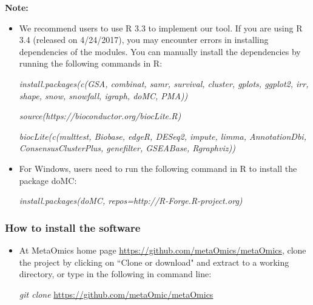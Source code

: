 {\bf Note:}
\begin{itemize}
\item We recommend users to use R 3.3 to implement our tool. If you are using R 3.4 (released on 4/24/2017), you may encounter errors in installing dependencies of the modules. You can manually install the dependencies by running the following commands in R:

\textit{install.packages(c(\textquotesingle GSA\textquotesingle, \textquotesingle combinat\textquotesingle, \textquotesingle   samr\textquotesingle   , \textquotesingle   survival\textquotesingle   , \textquotesingle   cluster\textquotesingle   , \textquotesingle   gplots\textquotesingle   , 
  \textquotesingle   ggplot2\textquotesingle   , \textquotesingle   irr\textquotesingle   , \textquotesingle   shape\textquotesingle   , \textquotesingle   snow\textquotesingle   , \textquotesingle   snowfall\textquotesingle   , \textquotesingle   igraph\textquotesingle   , \textquotesingle   doMC\textquotesingle   , \textquotesingle   PMA\textquotesingle   ))
  }

\textit{source(\textquotesingle   https://bioconductor.org/biocLite.R\textquotesingle   )  }

\textit{biocLite(c(\textquotesingle   multtest\textquotesingle   , \textquotesingle   Biobase\textquotesingle   , \textquotesingle   edgeR\textquotesingle   , \textquotesingle   DESeq2\textquotesingle   , \textquotesingle   impute\textquotesingle   , 
  \textquotesingle   limma\textquotesingle   , \textquotesingle   AnnotationDbi\textquotesingle   , \textquotesingle   ConsensusClusterPlus\textquotesingle   , \textquotesingle   genefilter\textquotesingle   , \textquotesingle   GSEABase\textquotesingle   , \textquotesingle   Rgraphviz\textquotesingle   ))
  }

\item For Windows, users need to run the following command in R to install the package \textquotesingle doMC\textquotesingle:

\textit{install.packages(\textquotesingle doMC\textquotesingle, repos=\textquotesingle http://R-Forge.R-project.org\textquotesingle)}

\end{itemize}

 

\subsubsection{How to install the software}
\begin{itemize}
\item At MetaOmics home page \url{https://github.com/metaOmics/metaOmics}, clone the project by
clicking on ``Clone or download" and extract to a working directory, 
or type in the following in command line:

\textit{git clone} \url{https://github.com/metaOmic/metaOmics}
\end{itemize}

